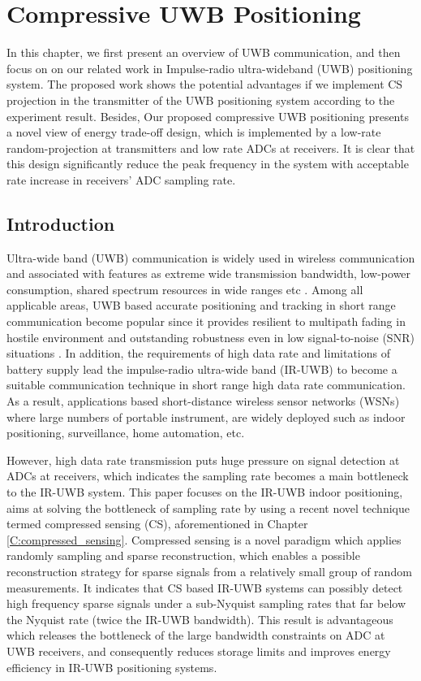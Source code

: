 \chapter{Compressive UWB Positioning}\label{C:compressive_uwb_positioning}
\indent \indent In this chapter, we first present an overview of UWB communication, and then focus on on our related work in Impulse-radio ultra-wideband (UWB) positioning system. The proposed work shows the potential advantages if we implement CS projection in the transmitter of the UWB positioning system according to the experiment result. Besides, Our proposed compressive UWB positioning presents a novel view of energy trade-off design, which is implemented by a low-rate random-projection at transmitters and low rate ADCs at receivers. It is clear that this design significantly reduce the peak frequency in the system with acceptable rate increase in receivers' ADC sampling rate.   

\section{Introduction}
\indent \indent Ultra-wide band (UWB) communication is widely used in wireless communication and associated with features as extreme wide transmission bandwidth, low-power consumption, shared spectrum resources in wide ranges etc \cite{paredes2007ultra}. Among all applicable areas, UWB based accurate positioning and tracking in short range communication become popular since it provides resilient to multipath fading in hostile environment and outstanding robustness even in low signal-to-noise (SNR) situations \cite{cassioli2002ultra}. In addition, the requirements of high data rate and limitations of battery supply lead the impulse-radio ultra-wide band (IR-UWB) to become a suitable communication technique in short range high data rate communication. As a result, applications based short-distance wireless sensor networks (WSNs) where large numbers of portable instrument, are widely deployed such as indoor positioning, surveillance, home automation, etc. 

However, high data rate transmission puts huge pressure on signal detection at ADCs at receivers, which indicates the sampling rate becomes a main bottleneck to the IR-UWB system. This paper focuses on the IR-UWB indoor positioning, aims at solving the bottleneck of sampling rate by using a recent novel technique termed compressed sensing (CS), aforementioned in Chapter \ref{C:compressed_sensing}. Compressed sensing is a novel paradigm which applies randomly sampling and sparse reconstruction, which enables a possible reconstruction strategy for sparse signals from a relatively small group of random measurements. It indicates that CS based IR-UWB systems can possibly detect high frequency sparse signals under a sub-Nyquist sampling rates that far below the Nyquist rate (twice the IR-UWB bandwidth). This result is advantageous which releases the bottleneck of the large bandwidth constraints on ADC at UWB receivers, and consequently reduces storage limits and improves energy efficiency in IR-UWB positioning systems.

